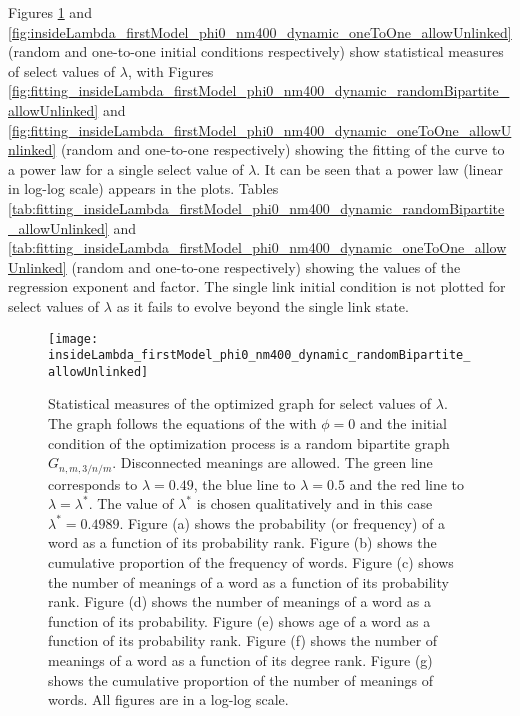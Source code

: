 Figures \ref{fig:insideLambda_firstModel_phi0_nm400_dynamic_randomBipartite_allowUnlinked} and \ref{fig:insideLambda_firstModel_phi0_nm400_dynamic_oneToOne_allowUnlinked} (random and one-to-one initial conditions respectively) show statistical measures of select values of $\lambda$, with Figures \ref{fig:fitting_insideLambda_firstModel_phi0_nm400_dynamic_randomBipartite_allowUnlinked} and \ref{fig:fitting_insideLambda_firstModel_phi0_nm400_dynamic_oneToOne_allowUnlinked} (random and one-to-one respectively) showing the fitting of the curve to a power law for a single select value of $\lambda$.
It can be seen that a power law (linear in log-log scale) appears in the plots.
Tables \ref{tab:fitting_insideLambda_firstModel_phi0_nm400_dynamic_randomBipartite_allowUnlinked} and \ref{tab:fitting_insideLambda_firstModel_phi0_nm400_dynamic_oneToOne_allowUnlinked} (random and one-to-one respectively) showing the values of the regression exponent and factor.
The single link initial condition is not plotted for select values of $\lambda$ as it fails to evolve beyond the single link state.

\begin{figure}
  \centering
  \texttt{[image: insideLambda\_firstModel\_phi0\_nm400\_dynamic\_randomBipartite\_allowUnlinked]}
  \caption{
    Statistical measures of the optimized graph for select values of $\lambda$.
    The graph follows the equations of the \firstmodel{} with $\phi=0$ and the initial condition of the optimization process is a random bipartite graph $G_{n,m,3/n/m}$. Disconnected meanings are allowed.
    The green line corresponds to $\lambda=0.49$, the blue line to $\lambda=0.5$ and the red line to $\lambda=\lambda^*$.
    The value of $\lambda^*$ is chosen qualitatively and in this case $\lambda^*=0.4989$.
    Figure (a) shows the probability (or frequency) of a word as a function of its probability rank.
    Figure (b) shows the cumulative proportion of the frequency of words.
    Figure (c) shows the number of meanings of a word as a function of its probability rank.
    Figure (d) shows the number of meanings of a word as a function of its probability.
    Figure (e) shows age of a word as a function of its probability rank.
    Figure (f) shows the number of meanings of a word as a function of its degree rank.
    Figure (g) shows the cumulative proportion of the number of meanings of words.
    All figures are in a log-log scale.
  }
  \label{fig:insideLambda_firstModel_phi0_nm400_dynamic_randomBipartite_allowUnlinked}
\end{figure}

